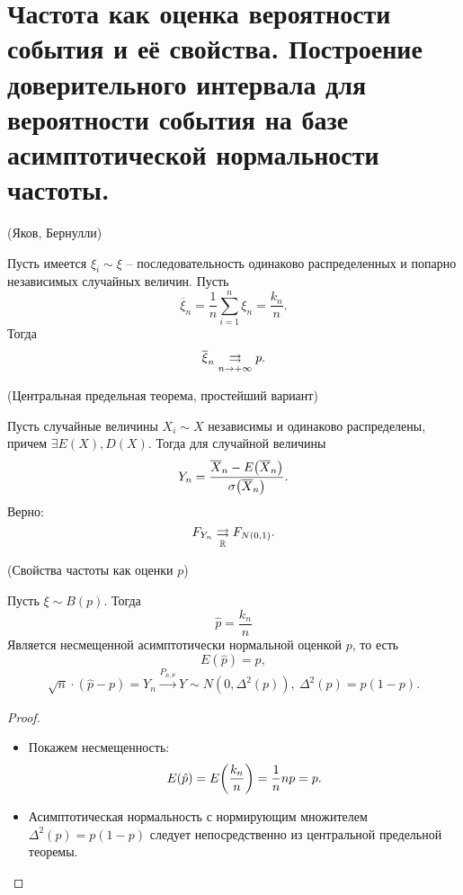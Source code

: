 \section{Частота как оценка вероятности события и её свойства.
    Построение доверительного интервала для вероятности события
на базе асимптотической нормальности частоты.}

\begin{theorem}(Яков, Бернулли)

    Пусть имеется $\xi_i \sim \xi$ -- последовательность одинаково 
    распределенных и попарно независимых случайных величин. Пусть
    \[
        \overline{\xi}_n = \frac{1}{n} \sum_{i = 1}^n{\xi_n} = \frac{k_n}{n}
    .\]
    Тогда
    \[
        \overline{\xi}_n \underset{n \to +\infty}{\rightrightarrows} p
    .\]
\end{theorem}

\begin{theorem}(Центральная предельная теорема, простейший вариант)

    Пусть случайные величины $X_i \sim X$ независимы и одинаково распределены,
    причем $\exists E(X), D(X)$. Тогда для случайной величины
    \[
        Y_n = \frac{\overline{X}_n - E\parens*{\overline{X}_n}}
        {\sigma\parens*{\overline{X}_n}}
    .\]
    Верно:
    \[
        F_{Y_n} \underset{\mathbb{R}}{\rightrightarrows} F_{N(0, 1)}
    .\]
\end{theorem}

\begin{theorem}(Свойства частоты как оценки $p$)

    Пусть $\xi \sim B(p)$. Тогда 
    \[
        \hat{p} = \frac{k_n}{n}
    \]
    Является несмещенной асимптотически нормальной оценкой $p$, то есть
    \[
        E(\hat{p}) = p,
    \]
    \[
        \sqrt{n} \cdot (\hat{p} - p) = Y_n \xrightarrow[]{P_{n, \theta}} Y 
        \sim N(0, \Delta^2(p)),~ \Delta^2(p) = p(1 - p)
    .\]
\end{theorem}
\begin{proof}
    \enewline
    \begin{itemize}
        \item Покажем несмещенность:
            \[
                E(\hat{p}) = E\parens*{\frac{k_n}{n}} = \frac{1}{n} np = p
            .\]
        \item Асимптотическая нормальность с нормирующим множителем
            $\Delta^2(p) = p(1 - p)$ следует непосредственно из
            центральной предельной теоремы.
    \end{itemize}
\end{proof}

